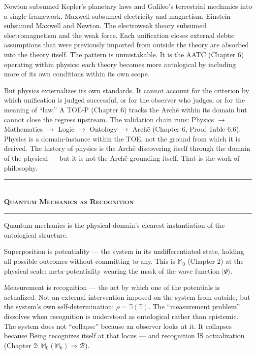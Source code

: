 \documentclass[10pt, openany, oneside]{book}
\renewcommand{\normalsize}{\fontsize{10}{13}\selectfont}
\begin{document}
Newton subsumed Kepler's planetary laws and Galileo's terrestrial mechanics into a single framework. Maxwell subsumed electricity and magnetism. Einstein subsumed Maxwell and Newton. The electroweak theory subsumed electromagnetism and the weak force. Each unification closes external debts: assumptions that were previously imported from outside the theory are absorbed into the theory itself. The pattern is unmistakable. It is the AATC (Chapter 6) operating within physics: each theory becomes more autological by including more of its own conditions within its own scope.

But physics externalizes its own standards. It cannot account for the criterion by which unification is judged successful, or for the observer who judges, or for the meaning of ``law.'' A TOE-P (Chapter 6) tracks the Arch\={e} within its domain but cannot close the regress upstream. The validation chain runs: Physics $\to$ Mathematics $\to$ Logic $\to$ Ontology $\to$ Arch\={e} (Chapter 6, Proof Table 6.6). Physics is a domain-instance within the TOE, not the ground from which it is derived. The history of physics is the Arch\={e} discovering itself through the domain of the physical --- but it is not the Arch\={e} grounding itself. That is the work of philosophy.

\vspace{1.5em}


\begin{center}
    \rule{0.3\textwidth}{0.4pt}\\[0.5em]
    {\normalsize\bfseries\scshape Quantum Mechanics as Recognition}\\[0.3em]
    \rule{0.3\textwidth}{0.4pt}
\end{center}

\vspace{1em}

\noindent Quantum mechanics is the physical domain's clearest instantiation of the ontological structure.

Superposition is potentiality --- the system in its undifferentiated state, holding all possible outcomes without committing to any. This is $\mathbb{M}_0$ (Chapter 2) at the physical scale: meta-potentiality wearing the mask of the wave function $|\Psi\rangle$.

Measurement is recognition --- the act by which one of the potentials is actualized. Not an external intervention imposed on the system from outside, but the system's own self-determination: $\rho = \exists(\exists)$. The ``measurement problem'' dissolves when recognition is understood as ontological rather than epistemic. The system does not ``collapse'' because an observer looks at it. It collapses because Being recognizes itself at that locus --- and recognition IS actualization (Chapter 2: $\mathbb{M}_0(\mathbb{M}_0) \Rightarrow \mathcal{B}$).
\end{document}
